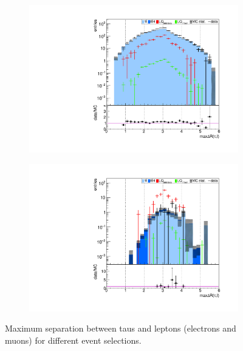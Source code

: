 \begin{figure}
\begin{subfigure}[t]{0.49\textwidth}
                \label{maxdR:taulepton:2b2tau}
                \end{subfigure}
                \begin{subfigure}[t]{0.49\textwidth}
                \includegraphics[width=\textwidth]{figures/plots/kinLQ75/maxdR_taulepton_2j1b_1tau.pdf}
                \label{maxdR:taulepton:1b1tau}
                \end{subfigure}
                \begin{subfigure}[t]{0.49\textwidth}
                \includegraphics[width=\textwidth]{figures/plots/kinLQ75/maxdR_taulepton_2j1b_2tau.pdf}
                \label{maxdR:taulepton:1b2tau}
                \end{subfigure}
\caption[Maximum separation between taus and leptons (electrons and muons) for different event selections.]{Maximum separation between taus and leptons (electrons and muons) for different event selections.}
\label{maxdR:taulepton}
\end{figure}
